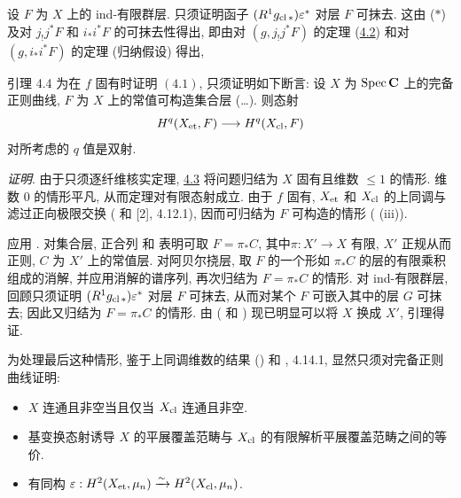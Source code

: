 设 $F$ 为 $X$ 上的 ind-有限群层. 只须证明函子 $(R^{1}g_{\operatorname{cl}\ast})\varepsilon^{\ast}$ 对层 $F$ 可抹去. 这由 ($\ast$) 及对 $j_{!}j^{\ast}F$ 和 $i_{\ast}i^{\ast}F$ 的可抹去性得出, 即由对 $(g,j_{!}j^{\ast}F)$ 的定理 (\hyperref[XVI.lem4.2]{4.2}) 和对 $(g,i_{\ast}i^{\ast}F)$ 的定理 (归纳假设) 得出, \cqfd

\begin{enonce*}{引理 4.4}
为在 $f$ 固有时证明 $\hyperref[XVI.thm4.1]{(4.1)}$, 只须证明如下断言: 设 $X$ 为 $\operatorname{Spec} \mathbf{C}$ 上的完备正则曲线, $F$ 为 $X$ 上的常值可构造集合层 (\resp\ldots). 则态射
$$
H^{q}(X_{\mathrm{et}},F)\longrightarrow H^{q}(X_{\operatorname{cl}},F)
$$
对所考虑的 $q$ 值是双射.
\end{enonce*}

\noindent
\emph{证明}. 由于只须逐纤维核实定理, \hyperref[XVI.lem4.3]{4.3} 将问题归结为 $X$ 固有且维数 $\leq 1$ 的情形. 维数 $0$ 的情形平凡, 从而定理对有限态射成立. 由于 $f$ 固有, $X_{\mathrm{et}}$ 和 $X_{\operatorname{cl}}$ 的上同调与滤过正向极限交换 ( 和 [2], 4.12.1), 因而可归结为 $F$ 可构造的情形 ( (iii)).

应用 . 对集合层, 正合列  和  表明可取 $F=\pi{}_{\ast}C$, 其中\pageoriginale $\pi:X'\rightarrow X$ 有限, $X'$ 正规从而正则, $C$ 为 $X'$ 上的常值层. 对阿贝尔挠层, 取 $F$ 的一个形如 $\pi_{\ast}C$ 的层的有限乘积组成的消解, 并应用消解的谱序列, 再次归结为 $F=\pi_{\ast}C$ 的情形. 对 ind-有限群层, 回顾只须证明 $(R^{1}g_{\operatorname{cl}\ast})\varepsilon^{\ast}$ 对层 $F$ 可抹去, 从而对某个 $F$ 可嵌入其中的层 $G$ 可抹去; 因此又归结为 $F=\pi_{\ast}C$ 的情形. 由 ( 和 ) 现已明显可以将 $X$ 换成 $X'$, 引理得证.

为处理最后这种情形, 鉴于上同调维数的结果 () 和 \cite{sga4.exp.XVI.bib.2}, 4.14.1, 显然只须对完备正则曲线证明:
\begin{itemize}
\item[$(q=0)$:] $X$ 连通且非空当且仅当 $X_{\operatorname{cl}}$ 连通且非空.

\item[$(q=1)$:] 基变换态射诱导 $X$ 的平展覆盖范畴与 $X_{\operatorname{cl}}$ 的有限解析平展覆盖范畴之间的等价.

\item[$(q=2)$:] 有同构 $\varepsilon:H^2(X_{\mathrm{et}},\mu_n)\xrightarrow{\sim}H^2(X_{\operatorname{cl}},\mu_n)$.
\end{itemize}

